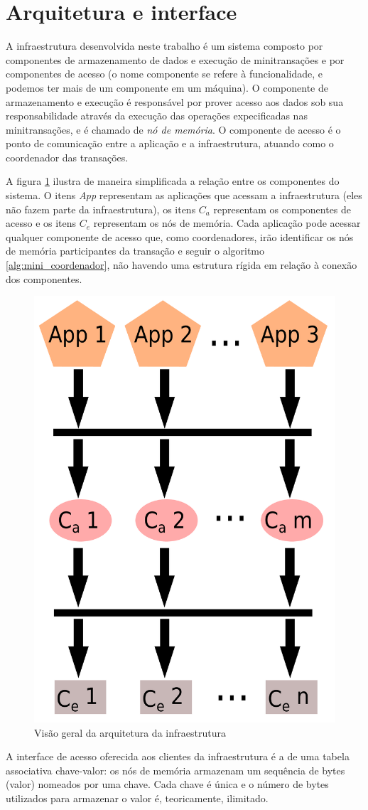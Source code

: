 \documentclass[11pt,twoside,a4paper]{book}
\begin{document}
\section{Arquitetura e interface}
\label{sec:arquitetura}

A infraestrutura desenvolvida neste trabalho é um sistema composto por componentes de armazenamento de dados e execução de minitransações e por componentes de acesso (o nome componente se refere à funcionalidade, e podemos ter mais de um componente em um máquina). O componente de armazenamento e execução é responsável por prover acesso aos dados sob sua responsabilidade através da execução das operações expecificadas nas minitransações, e é chamado de \emph{nó de memória}. O componente de acesso é o ponto de comunicação entre a aplicação e a infraestrutura, atuando como o coordenador das transações.

A figura \ref{fig:overview_arquitetura} ilustra de maneira simplificada a relação entre os componentes do sistema. O itens \emph{App} representam as aplicações que acessam a infraestrutura (eles não fazem parte da infraestrutura), os itens \emph{$C_a$} representam os componentes de acesso e os itens \emph{$C_e$} representam os nós de memória. Cada aplicação pode acessar qualquer componente de acesso que, como coordenadores, irão identificar os nós de memória participantes da transação e seguir o algoritmo \ref{alg:mini_coordenador}, não havendo uma estrutura rígida em relação à conexão dos componentes.

\begin{figure}
  \centering
  \includegraphics[width=.40\textwidth]{overview_arquitetura} 
  \caption{Visão geral da arquitetura da infraestrutura}
  \label{fig:overview_arquitetura} 
\end{figure}

A interface de acesso oferecida aos clientes da infraestrutura é a de uma tabela associativa chave-valor: os nós de memória armazenam um sequência de bytes (valor) nomeados por uma chave. Cada chave é única e o número de bytes utilizados para armazenar o valor é, teoricamente, ilimitado. 
\end{document}

